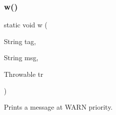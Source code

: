 \subsubsection{\texorpdfstring{w()}{w()}\hspace{0.1cm}{\footnotesize\ttfamily [1/3]}}
{\footnotesize\ttfamily static void w (\begin{DoxyParamCaption}\item[{String}]{tag,  }\item[{String}]{msg,  }\item[{Throwable}]{tr }\end{DoxyParamCaption})\hspace{0.3cm}{\ttfamily [static]}}



Prints a message at W\+A\+RN priority. 


